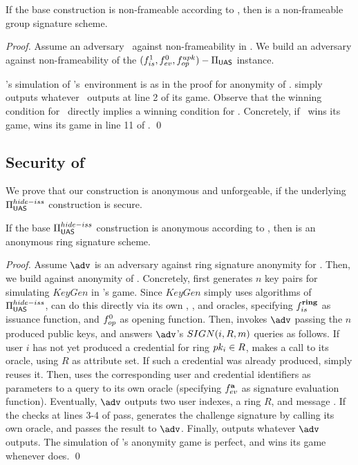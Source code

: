 \begin{theorem}
  If the base \CUASGen construction is non-frameable according to
  , then \CUASGS is a non-frameable group signature
  scheme.
\end{theorem}

\begin{proof}
  Assume an adversary \adv~against non-frameability in \CUASGS. We build an
  adversary \advB against non-frameability of the $(f_{is}^1,f_{ev}^0,
  f_{op}^{upk})-\Pi_{\mathsf{UAS}}$ instance.
  
  \advB's simulation of \adv's~environment is as in the proof for anonymity
  of \CUASGS. \advB simply outputs whatever \adv~outputs at line 2 of its
  game. Observe that the winning condition for \adv~directly implies a winning
  condition for \advB. Concretely, if \adv~wins its game, \advB wins its game
  in line 11 of \ExpNonframe.
  \qed
\end{proof}

\subsection{Security of \CUASRing}

We prove that our \CUASRing construction is anonymous and unforgeable, if
the underlying $\Pi_{\mathsf{UAS}}^{hide-iss}$ construction is secure.

\begin{theorem}
  If the base $\Pi_{\mathsf{UAS}}^{hide-iss}$ construction is anonymous according to
  , then \CUASRing is an anonymous ring signature
  scheme.
\end{theorem}

\begin{proof}
  Assume $\adv$ is an adversary against ring signature anonymity for \CUASRing.
  Then, we build \advB against anonymity of \CUASGen. Concretely, \advB first
  generates $n$ key pairs for \adv simulating $KeyGen$ in \adv's game. Since
  $KeyGen$ simply uses algorithms of $\Pi_{\mathsf{UAS}}^{hide-iss}$, \advB can do this
  directly via its own \HUGEN, \ISET, and \OGEN oracles, specifying
  $f_{is}^{\mathbf{ring}}$ as issuance function, and $f_{op}^0$ as opening function.
  Then, \advB invokes $\adv$ passing the $n$ produced public keys, and
  answers $\adv$'s $SIGN(i,R,m)$ queries as follows. If user $i$ has not yet
  produced a credential for ring $pk_i \in R$, \advB makes a call to its
  \OBTAIN oracle, using $R$ as attribute set. If such a credential was already
  produced, \advB simply reuses it. Then, \advB uses the corresponding user and
  credential identifiers as parameters to a query to its own \SIGN oracle
  (specifying $f_{ev}^{\mathbf{a}}$ as signature evaluation function). Eventually,
  $\adv$ outputs two user indexes, a ring $R$, and message \msg. If the checks
  at lines 3-4 of  pass, \advB generates the challenge
  signature by calling its own \CHALb oracle, and passes the result to $\adv$.
  Finally, \advB outputs whatever $\adv$ outputs.
  The simulation of \adv's anonymity game is perfect, and \advB wins its game
  whenever \adv does.
  \qed
\end{proof}

